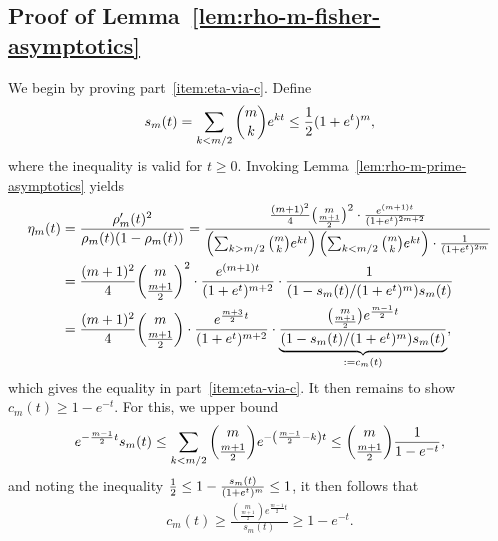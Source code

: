\subsection{Proof of Lemma~\ref{lem:rho-m-fisher-asymptotics}} \label{proof:rho-m-fisher-asymptotics}

We begin by proving part~\ref{item:eta-via-c}. Define
\begin{equation*}
  s_m(t) = \sum_{k <
    m/2} \binom{m}{k} e^{kt} \le \frac{1}{2} (1+e^t)^m,
\end{equation*}
where the inequality is valid for $t \ge 0$.
Invoking Lemma~\ref{lem:rho-m-prime-asymptotics} yields
\begin{align*}
	\eta_m(t) & = \frac{\rho_m'(t)^2}{\rho_m(t)(1-\rho_m(t))} = \frac{\frac{(m+1)^2}{4} \binom{m}{\frac{m+1}{2}}^2 \cdot \frac{e^{(m+1)t}}{(1+e^t)^{2m+2}}}{\left({\sum_{k > m/2} \binom{m}{k} e^{kt}}\right) \left({\sum_{k < m/2} \binom{m}{k} e^{kt}}\right) \cdot \frac{1}{(1+e^t)^{2m}}} \nonumber \\
	& = \frac{(m+1)^2}{4} \binom{m}{\frac{m+1}{2}}^2 \cdot \frac{e^{(m+1)t}}{(1+e^t)^{m+2}} \cdot \frac{1}{(1 - s_m(t)/(1+e^t)^m) s_m(t)} \nonumber \\
	& = \frac{(m+1)^2}{4} \binom{m}{\frac{m+1}{2}} \cdot \frac{e^{\frac{m+3}{2}t}}{(1+e^t)^{m+2}} \cdot \underbrace{\frac{ \binom{m}{\frac{m+1}{2}} e^{\frac{m-1}{2}t}}{(1 - s_m(t)/(1+e^t)^m) s_m(t)}}_{:=c_m(t)},
\end{align*}
which gives the equality in part~\ref{item:eta-via-c}.
It then remains to show $c_m(t) \geq 1 - e^{-t}$. For this,
we upper bound
\begin{align*}
  e^{-\frac{m-1}{2}t} s_m(t) \leq \sum_{k < m/2}\binom{m}{\frac{m+1}{2}} e^{-\left({\frac{m-1}{2}-k}\right)t} \leq \binom{m}{\frac{m+1}{2}} \frac{1}{1-e^{-t}},
\end{align*}
and noting the inequality
$\frac{1}{2} \le 1 - \frac{s_m(t)}{(1+e^t)^m} \leq 1$, it then follows
that
\begin{align*}
  c_m(t) \geq \frac{\binom{m}{\frac{m+1}{2}} e^{\frac{m-1}{2}t}}{s_m(t)} \geq 1 -e^{-t}.
\end{align*}


